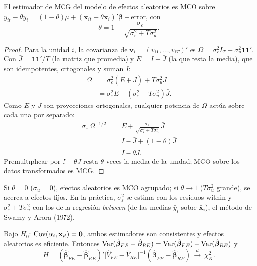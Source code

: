 \begin{proposicion}\label{prop:re}
El estimador de MCG del modelo de efectos aleatorios es MCO sobre
$y_{it}-\theta\bar y_i=(1-\theta)\mu+(\mathbf x_{it}-\theta\bar{\mathbf x}_i)'\boldsymbol\beta+\text{error}$, con
\[
  \theta=1-\frac{\sigma_\varepsilon}{\sqrt{\sigma_\varepsilon^2+T\sigma_u^2}}.
\]
\end{proposicion}

\begin{proof}
Para la unidad $i$, la covarianza de $\mathbf v_i=(v_{i1},\dots,v_{iT})'$ es $\Omega=\sigma_\varepsilon^2I_T+\sigma_u^2\mathbf 1\mathbf 1'$. Con
$\bar J=\mathbf 1\mathbf 1'/T$ (la matriz que promedia) y $E=I-\bar J$ (la que resta la media), que son idempotentes,
ortogonales y suman $I$:
\begin{align*}
  \Omega &= \sigma_\varepsilon^2(E+\bar J)+T\sigma_u^2\bar J\\
         &= \sigma_\varepsilon^2E+(\sigma_\varepsilon^2+T\sigma_u^2)\bar J .
\end{align*}
Como $E$ y $\bar J$ son proyecciones ortogonales, cualquier potencia de $\Omega$ actúa sobre cada una por separado:
\begin{align*}
  \sigma_\varepsilon\,\Omega^{-1/2} &= E+\frac{\sigma_\varepsilon}{\sqrt{\sigma_\varepsilon^2+T\sigma_u^2}}\,\bar J\\
                                  &= I-\bar J+(1-\theta)\bar J\\
                                  &= I-\theta\bar J .
\end{align*}
Premultiplicar por $I-\theta\bar J$ resta $\theta$ veces la media de la unidad; MCO sobre los datos transformados es MCG.
\end{proof}

Si $\theta=0$ ($\sigma_u=0$), efectos aleatorios es MCO agrupado; si $\theta\to1$ ($T\sigma_u^2$ grande), se acerca a
efectos fijos. En la práctica, $\sigma_\varepsilon^2$ se estima con los residuos within y $\sigma_\varepsilon^2+T\sigma_u^2$ con los de
la regresión \emph{between} (de las medias $\bar y_i$ sobre $\bar{\mathbf x}_i$), el método de Swamy y Arora (1972).

\begin{proposicion}\label{prop:hausman}
Bajo $H_0$: $\operatorname{Cov}(\alpha_i,\mathbf x_{it})=\mathbf 0$, ambos estimadores son consistentes y efectos aleatorios es eficiente. Entonces
$\operatorname{Var}(\hat{\boldsymbol\beta}_{FE}-\hat{\boldsymbol\beta}_{RE})=\operatorname{Var}(\hat{\boldsymbol\beta}_{FE})-\operatorname{Var}(\hat{\boldsymbol\beta}_{RE})$ y
\[
  H=(\hat{\boldsymbol\beta}_{FE}-\hat{\boldsymbol\beta}_{RE})'\bigl[\hat V_{FE}-\hat V_{RE}\bigr]^{-1}(\hat{\boldsymbol\beta}_{FE}-\hat{\boldsymbol\beta}_{RE})\ \xrightarrow{d}\ \chi^2_K .
\]
\end{proposicion}

